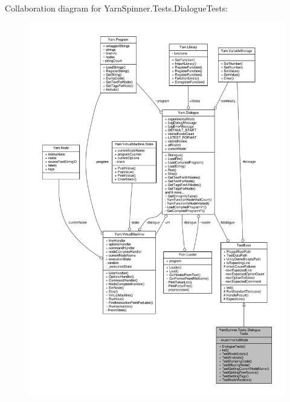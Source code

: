 Collaboration diagram for Yarn\-Spinner.\-Tests.\-Dialogue\-Tests\-:
\nopagebreak
\begin{figure}[H]
\begin{center}
\leavevmode
\includegraphics[width=350pt]{a00817}
\end{center}
\end{figure}
